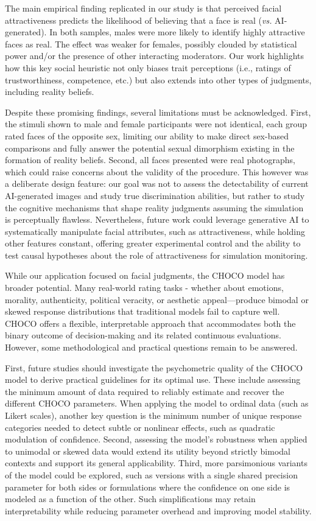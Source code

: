 \documentclass[
  jou,
  floatsintext,
  longtable,
  nolmodern,
  notxfonts,
  notimes,
  colorlinks=true,linkcolor=blue,citecolor=blue,urlcolor=blue]{apa7}
\begin{document}
The main empirical finding replicated in our study is that perceived
facial attractiveness predicts the likelihood of believing that a face
is real (\emph{vs.} AI-generated). In both samples, males were more
likely to identify highly attractive faces as real. The effect was
weaker for females, possibly clouded by statistical power and/or the
presence of other interacting moderators. Our work highlights how this
key social heuristic not only biases trait perceptions (i.e., ratings of
trustworthiness, competence, etc.) but also extends into other types of
judgments, including reality beliefs.

Despite these promising findings, several limitations must be
acknowledged. First, the stimuli shown to male and female participants
were not identical, each group rated faces of the opposite sex, limiting
our ability to make direct sex-based comparisons and fully answer the
potential sexual dimorphism existing in the formation of reality
beliefs. Second, all faces presented were real photographs, which could
raise concerns about the validity of the procedure. This however was a
deliberate design feature: our goal was not to assess the detectability
of current AI-generated images and study true discrimination abilities,
but rather to study the cognitive mechanisms that shape reality
judgments assuming the simulation is perceptually flawless.
Nevertheless, future work could leverage generative AI to systematically
manipulate facial attributes, such as attractiveness, while holding
other features constant, offering greater experimental control and the
ability to test causal hypotheses about the role of attractiveness for
simulation monitoring.

While our application focused on facial judgments, the CHOCO model has
broader potential. Many real-world rating tasks - whether about
emotions, morality, authenticity, political veracity, or aesthetic
appeal---produce bimodal or skewed response distributions that
traditional models fail to capture well. CHOCO offers a flexible,
interpretable approach that accommodates both the binary outcome of
decision-making and its related continuous evaluations. However, some
methodological and practical questions remain to be answered.

First, future studies should investigate the psychometric quality of the
CHOCO model to derive practical guidelines for its optimal use. These
include assessing the minimum amount of data required to reliably
estimate and recover the different CHOCO parameters. When applying the
model to ordinal data (such as Likert scales), another key question is
the minimum number of unique response categories needed to detect subtle
or nonlinear effects, such as quadratic modulation of confidence.
Second, assessing the model's robustness when applied to unimodal or
skewed data would extend its utility beyond strictly bimodal contexts
and support its general applicability. Third, more parsimonious variants
of the model could be explored, such as versions with a single shared
precision parameter for both sides or formulations where the confidence
on one side is modeled as a function of the other. Such simplifications
may retain interpretability while reducing parameter overhead and
improving model stability.
\end{document}
